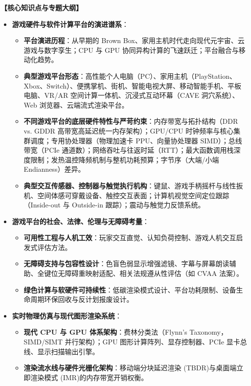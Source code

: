 \textbf{【核心知识点与专题大纲】}
\begin{itemize}
    \item \textbf{游戏硬件与软件计算平台的演进谱系}：
    \begin{itemize}
        \item \textbf{平台演进历程}：从早期的 Brown Box、家用主机时代走向现代元宇宙、云游戏与数字孪生；CPU 与 GPU 协同异构计算的飞速跃迁；平台融合与移动化趋势。
        \item \textbf{典型游戏平台形态}：高性能个人电脑（PC）、家用主机（PlayStation、Xbox、Switch）、便携掌机、街机、智能电视大屏、移动智能手机、平板电脑、VR/AR 空间计算一体机、沉浸式互动环幕（CAVE 洞穴系统）、Web 浏览器、云端流式渲染平台。
        \item \textbf{不同游戏平台的底层硬件特性与严苛约束}：内存带宽与拓扑结构（DDR vs. GDDR 高带宽高延迟统一内存架构）；GPU/CPU 时钟频率与核心集群调度；专用协处理器（物理加速卡 PPU、向量协处理器 SIMD）；总线带宽（PCIe 通道数）；网络吞吐与往返时延（RTT）；最大函数调用栈深度限制；发热温控降频机制与整机功耗预算；字节序（大端/小端 Endianness）差异。
        \item \textbf{典型交互传感器、控制器与触觉执行机构}：键鼠、游戏手柄摇杆与线性扳机、空间体感可穿戴设备、触控交互表面；计算机视觉空间定位跟踪（Inside-out 与 Outside-in 跟踪）；震动与触觉力反馈系统。
    \end{itemize}
    \item \textbf{游戏平台的社会、法律、伦理与无障碍考量}：
    \begin{itemize}
        \item \textbf{可用性工程与人机工效}：玩家交互直觉、认知负荷控制、游戏人机交互启发式评估方法。
        \item \textbf{无障碍支持与包容性设计}：色盲色弱显示增强滤镜、字幕与屏幕朗读辅助、全键位无障碍重映射适配、相关法规遵从性评估（如 CVAA 法案）。
        \item \textbf{绿色计算与软硬件可持续性}：低碳渲染模式设计、平台功耗限制、设备生命周期环保回收与反计划报废设计。
    \end{itemize}
    \item \textbf{实时物理仿真与现代图形渲染系统}：
    \begin{itemize}
        \item \textbf{现代 CPU 与 GPU 体系架构}：费林分类法（Flynn's Taxonomy，SIMD/SIMT 并行架构）；GPU 图形计算阵列、显存控制器、PCIe 显卡总线、显示扫描输出引擎。
        \item \textbf{渲染流水线与硬件光栅化架构}：移动端分块延迟渲染 (TBDR)与桌面端立即渲染模式 (IMR)的内存带宽开销权衡。

\end{itemize}
\end{itemize}
